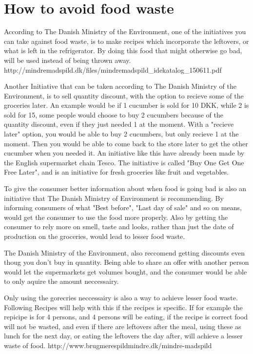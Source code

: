 \section{How to avoid food waste}

According to The Danish Ministry of the Environment, one of the initiatives you can take against food waste, is to make recipes which incorporate the leftovers, or what is left in the refrigerator. By doing this food that might otherwise go bad, will be used instead of being thrown away. http://mindremadspild.dk/files/mindremadspild_idekatalog_150611.pdf

Another Initiative that can be taken according to The Danish Ministry of the Environment, is to sell quantity discount, with the option to recieve some of the groceries later. An example would be if 1 cucumber is sold for 10 DKK, while 2 is sold for 15, some people would choose to buy 2 cucumbers because of the quantity discount, even if they just needed 1 at the moment. With a "recieve later" option, you would be able to buy 2 cucumbers, but only recieve 1 at the moment. Then you would be able to come back to the store later to get the other cucumber when you needed it. An initiative like this have already been made by the English supermarket chain Tesco. The initiative is called "Buy One Get One Free Later", and is an initiative for fresh groceries like fruit and vegetables.

To give the consumer better information about when food is going bad is also an initiative that The Danish Ministry of Environment is recommending. By informing consumers of what "Best before", "Last day of sale" and so on means, would get the consumer to use the food more properly. Also by getting the consumer to rely more on smell, taste and looks, rather than just the date of production on the groceries, would lead to lesser food waste.

The Danish Ministry of the Environment, also reccomend getting discounts even thoug you don't buy in quantity. Being able to share an offer with another person would let the supermarkets get volumes bought, and the consumer would be able to only aquire the amount neccessairy.

Only using the gorecries neccessairy is also a way to achieve lesser food waste. Following Recipes will help with this if the recipes is specific. If for example the repicipe is for 4 persons, and 4 persons will be eating, if the recipe is correct food will not be wasted, and even if there are leftovers after the meal, using these as lunch for the next day, or eating the leftovers the day after, will achieve a lesser waste of food. http://www.brugmerespildmindre.dk/mindre-madspild

